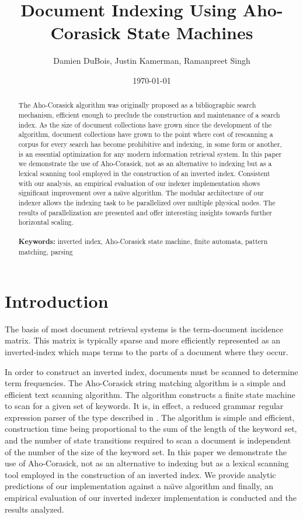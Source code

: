 \documentclass[10pt]{article}
\title{Document Indexing Using Aho-Corasick State Machines}
\author{Damien DuBois, Justin Kamerman, Ramanpreet Singh}
\date{\today}
\begin{document}
\maketitle

\begin{abstract}
The Aho-Corasick algorithm was originally proposed as a bibliographic
search mechanism, efficient enough to preclude the construction and
maintenance of a search index. As the size of document collections
have grown since the development of the algorithm, document
collections have grown to the point where cost of rescanning a corpus
for every search has become prohibitive and indexing, in some form or
another, is an essential optimization for any modern information
retrieval system. In this paper we demonstrate the use of
Aho-Corasick, not as an alternative to indexing but as a lexical
scanning tool employed in the construction of an inverted
index. Consistent with our analysis, an empirical evaluation of our
indexer implementation shows significant improvement over a na\"{\i}ve
algorithm. The modular architecture of our indexer allows the indexing
task to be parallelized over multiple physical nodes. The results of
parallelization are presented and offer interesting insights towards
further horizontal scaling.
\\\\
{\bf Keywords:} inverted index, Aho-Corasick state machine, finite
automata, pattern matching, parsing
\end{abstract}


\section{Introduction}
The basis of most document retrieval systems is the
term-document incidence matrix. This matrix is typically sparse and
more efficiently represented as an inverted-index which maps terms to
the parts of a document where they occur.

In order to construct an inverted index, documents must be scanned to
determine term frequencies. The Aho-Corasick string matching
algorithm\cite{RefWorks:103} is a simple and efficient text scanning
algorithm. The algorithm constructs a finite state machine to scan for
a given set of keywords. It is, in effect, a reduced grammar regular
expression parser of the type described in \cite{RefWorks:111}. The
algorithm is simple and efficient, construction time being
proportional to the sum of the length of the keyword set, and the
number of state transitions required to scan a document is independent
of the number of the size of the keyword set. In this paper we
demonstrate the use of Aho-Corasick, not as an alternative to indexing
but as a lexical scanning tool employed in the construction of an
inverted index. We provide analytic predictions of our implementation
against a na\"{\i}ve algorithm and finally, an empirical evaluation of
our inverted indexer implementation is conducted and the results
analyzed.
\end{document}
